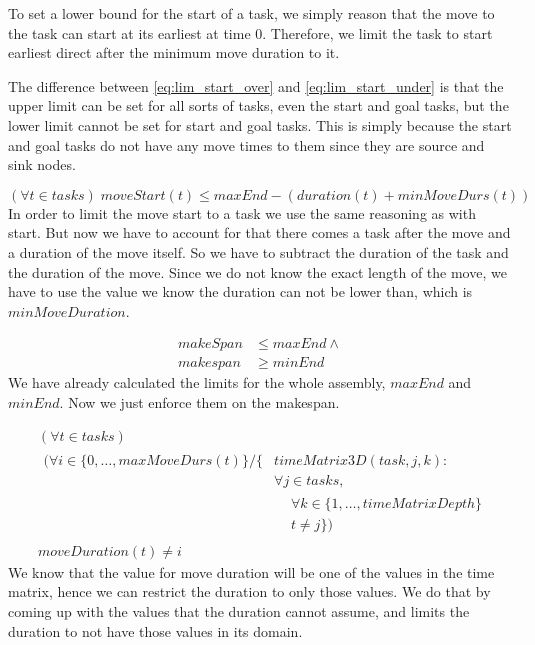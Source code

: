  To set a lower bound for the start of a task, we simply reason that the move to the task can start at its earliest at time 0. Therefore, we limit the task to start earliest direct after the minimum move duration to it.
 
 The difference between \ref{eq:lim_start_over} and \ref{eq:lim_start_under} is that the upper limit can be set for all sorts of tasks, even the start and goal tasks, but the lower limit cannot be set for start and goal tasks. This is simply because the start and goal tasks do not have any move times to them since they are source and sink nodes.
 
  \begin{equation}\label{eq:63}
  (\forall t \in tasks) \; moveStart(t) \le maxEnd-(duration(t)+minMoveDurs(t))
  \end{equation}
  In order to limit the move start to a task we use the same reasoning as with start. But now we have to account for that there comes a task after the move and a duration of the move itself. So we have to subtract the duration of the task and the duration of the move. Since we do not know the exact length of the move, we have to use the value we know the duration can not be lower than, which is $minMoveDuration$.
  
  \begin{equation}\label{eq:66}
  \begin{aligned}
  makeSpan &\le maxEnd \land\\
  makespan &\ge minEnd
  \end{aligned}
  \end{equation}
  We have already calculated the limits for the whole assembly, $maxEnd$ and $minEnd$. Now we just enforce them on the makespan.
  
  \begin{equation}
  \begin{aligned}\label{eq:67}
  &(\forall t \in tasks)\\
  &\begin{aligned}
  (\forall i \in \{0 , \ldots , maxMoveDurs(t)\} / \{&timeMatrix3D(task,j,k) :\\
  &\forall j \in tasks,\\
  &\begin{aligned}
  &\forall k \in \{1 , \ldots , timeMatrixDepth\}\\
  &t \neq j\})
  \end{aligned}
  \end{aligned}\\
  &moveDuration(t) \neq i
  \end{aligned}
  \end{equation}
 We know that the value for move duration will be one of the values in the time matrix, hence we can restrict the duration to only those values. We do that by coming up with the values that the duration cannot assume, and limits the duration to not have those values in its domain.
  
